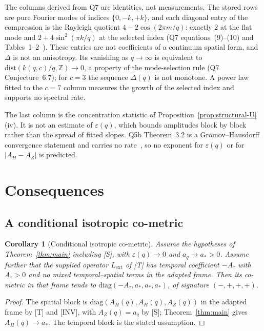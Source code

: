 \documentclass[12pt,a4paper]{article}
\newtheorem{corollary}[theorem]{Corollary}
\theoremstyle{definition}
\theoremstyle{remark}
\begin{document}
    The columns derived from Q7 are identities, not measurements.
    The stored rows are pure Fourier modes of indices $\{0, -k, +k\}$, and each diagonal entry of the compression
    is the Rayleigh quotient $4 - 2\cos(2\pi m/q)$: exactly $2$ at the flat mode and $2 + 4\sin^2(\pi k/q)$ at the
    selected index (Q7 equations~(9)--(10) and Tables~1--2~\cite{Beau2026q7}).
    These entries are not coefficients of a continuum spatial form, and $\Delta$ is not an anisotropy.
    Its vanishing as $q \to \infty$ is equivalent to $\mathrm{dist}(k(q,c)/q, \mathbb{Z}) \to 0$, a property of
    the mode-selection rule (Q7 Conjecture~6.7); for $c = 3$ the sequence $\Delta(q)$ is not monotone.
    A power law fitted to the $c = 7$ column measures the growth of the selected index and supports no spectral
    rate.

    The last column is the concentration statistic of Proposition~\ref{prop:structural-U}(iv).
    It is not an estimate of $\varepsilon(q)$, which bounds amplitudes block by block rather than the spread of
    fitted slopes.
    Q5b Theorem~3.2 is a Gromov--Hausdorff convergence statement and carries no rate~\cite{Beau2026q5b}, so no
    exponent for $\varepsilon(q)$ or for $|A_H - A_Z|$ is predicted.

  \section{Consequences}\label{sec:consequences}

    \subsection{A conditional isotropic co-metric}

      \begin{corollary}[Conditional isotropic co-metric]\label{cor:metric}
        Assume the hypotheses of Theorem~\ref{thm:main} including \textup{[S]}, with $\varepsilon(q) \to 0$ and
        $a_q \to a_* > 0$.
        Assume further that the supplied operator $L_{\mathrm{ext}}$ of \textup{[T]} has temporal coefficient
        $-A_\tau$ with $A_\tau > 0$ and no mixed temporal--spatial terms in the adapted frame.
        Then its co-metric in that frame tends to $\mathrm{diag}(-A_\tau, a_*, a_*, a_*)$, of signature
        $(-,+,+,+)$.
      \end{corollary}

      \begin{proof}
        The spatial block is $\mathrm{diag}(A_H(q), A_H(q), A_Z(q))$ in the adapted frame by [T] and [INV], with
        $A_Z(q) = a_q$ by [S]; Theorem~\ref{thm:main} gives $A_H(q) \to a_*$.
        The temporal block is the stated assumption.
      \end{proof}
\end{document}
